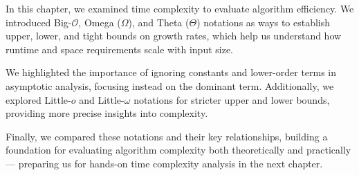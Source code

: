 In this chapter, we examined time complexity to evaluate algorithm efficiency. We introduced Big-$\mathcal{O}$, Omega ($\Omega$), and Theta ($\Theta$) notations as ways to establish upper, lower, and tight bounds on growth rates, which help us understand how runtime and space requirements scale with input size.

We highlighted the importance of ignoring constants and lower-order terms in asymptotic analysis, focusing instead on the dominant term. Additionally, we explored Little-$o$ and Little-$\omega$ notations for stricter upper and lower bounds, providing more precise insights into complexity.

Finally, we compared these notations and their key relationships, building a foundation for evaluating algorithm complexity both theoretically and practically — preparing us for hands-on time complexity analysis in the next chapter.
